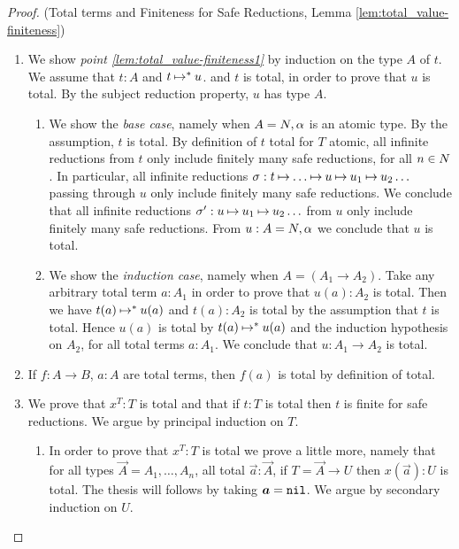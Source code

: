 \begin{proof}(Total terms and Finiteness for Safe Reductions, 
Lemma \ref{lem:total_value-finiteness})
\begin{enumerate}
\item
  We show \emph{point \ref{lem:total_value-finiteness1}}  by induction on the type $A$ of $t$. 
  We assume that $t:A$ and $t \mathbin{\mapsto} ^*u$.
  and $t$ is total, in order to prove that $u$ is total.
  By the subject reduction property, $u$ has type $A$.
\begin{enumerate}
\item
  We show the \emph{base case}, namely when $A ={N},\alpha$ is an atomic type.
  By the assumption, $t$ is total.
  By definition of $t$ total for $T$ atomic, all infinite 
  reductions from $t$ only include finitely many safe reductions, for all $n \in {N}$.
  In particular, all infinite reductions $\sigma: t \mathbin{\mapsto} \ldots \mathbin{\mapsto} 
  u \mathbin{\mapsto} u_1 \mathbin{\mapsto} u_2 \ldots$ 
  passing through $u$ only include finitely many safe reductions. We conclude that
  all infinite reductions 
  $\sigma': u \mathbin{\mapsto} u_1 \mathbin{\mapsto} u_2 \ldots$  from $u$
  only include finitely many safe reductions. 
  From $u:A ={N},\alpha$ we conclude that  $u$ is total.
  
\item
  We show the \emph{induction case}, namely when $A = (A_1\rightarrow A_2)$.
  Take any arbitrary total term $a:A_1$ in order to prove that $u(a):A_2$ is total. 
  Then we have $t(a) \mathbin{\mapsto}^{*} u(a)$ and 
  $t(a):A_2$ is total by the assumption that $t$ is total.
  Hence $u(a)$ is total by $t(a) \mathbin{\mapsto}^{*} u(a)$ and the induction hypothesis on $A_2$,
  for all total terms $a:A_1$. 
  We conclude that $u:A_1\rightarrow A_2$ is total. 
\end{enumerate}

  \item
If $f:A \rightarrow B$, $a:A$ are total  terms, then $f(a)$  is total by definition of total.

\item
We prove that $x^T:T$ is total and that 
if $t:T$ is total then $t$ is finite for safe reductions.
We argue by principal induction on $T$.

\begin{enumerate}
\item
In order to prove that $x^T:T$ is total we prove a little more, namely
that for all types $\vec{A} = A_1, \ldots, A_n$, 
all total $\vec{a}:\vec{A}$, if $T = \vec{A} \rightarrow U$ then $x(\vec{a}):U$
is total. The thesis will follows by taking $\vec{a} = \nil$. 
We argue by secondary induction on $U$. 


\end{enumerate}
\end{enumerate}
\end{proof}
